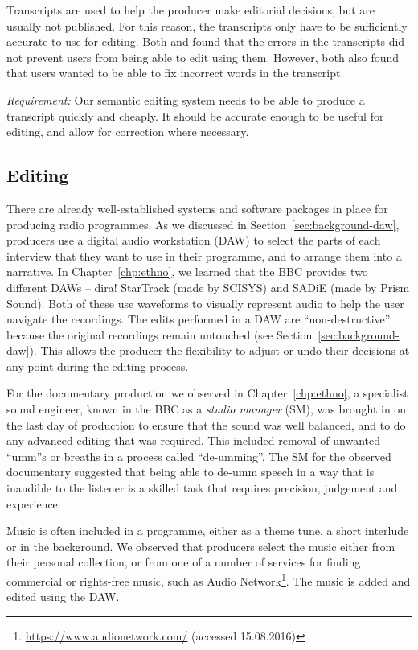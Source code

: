 Transcripts are used to help the producer make editorial decisions, but are usually not published. For this reason, the
transcripts only have to be sufficiently accurate to use for editing. Both \citet{Whittaker2004} and
\citet{Sivaraman2016} found that the errors in the transcripts did not prevent users from being able to edit using
them. However, both also found that users wanted to be able to fix incorrect words in the transcript.

\textit{Requirement:} Our semantic editing system needs to be able to produce a transcript quickly and cheaply. It
should be accurate enough to be useful for editing, and allow for correction where necessary.

\subsection{Editing}
There are already well-established systems and software packages in place for producing radio programmes. As we discussed in
Section~\ref{sec:background-daw}, producers use a digital audio workstation (DAW) to select the parts of each interview
that they want to use in their programme, and to arrange them into a narrative. In Chapter~\ref{chp:ethno}, we learned
that the BBC provides two different DAWs --
dira! StarTrack (made by SCISYS) and SADiE (made by Prism Sound).
Both of these use waveforms to visually represent audio to help the user navigate the recordings. The edits performed
in a DAW are ``non-destructive'' because the original recordings remain untouched (see
Section~\ref{sec:background-daw}). This allows the producer the flexibility to adjust or undo their decisions at any
point during the editing process.

For the documentary production we observed in Chapter~\ref{chp:ethno}, a specialist sound engineer, known in the BBC as
a \textit{studio manager} (SM), was brought in on the last day of production to ensure that the sound was well
balanced, and to do any advanced editing that was required. This included removal of unwanted ``umm''s or breaths in a
process called ``de-umming''. The SM for the observed documentary suggested that being able to de-umm speech in a way
that is inaudible to the listener is a skilled task that requires precision, judgement and experience.

Music is often included in a programme, either as a theme tune, a short interlude or in the background. We observed
that producers
select the music either from their personal collection, or from one of a number of services for finding
commercial or rights-free music, such as Audio Network\footnote{\url{https://www.audionetwork.com/} (accessed
15.08.2016)}.  The music is added and edited using the DAW.

